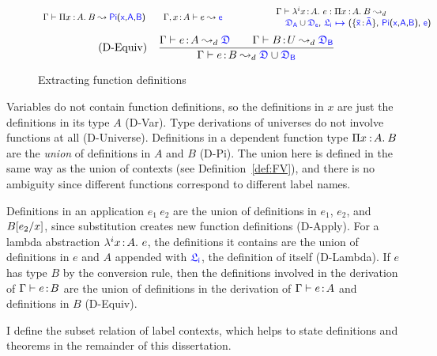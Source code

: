\begin{figure}
\begin{equation}
{{\begin{array}{l @{\qquad} l}
			   \Gamma \vdash \pitype{x}{A}{B} \leadsto \targetpi{x}{A}{B} &
			   \Gamma, x \goodcolon A \vdash e \leadsto \target{e}\\
        	\end{array}}}
			{\begin{array}{c}
			 \Gamma \vdash \lami{i}{x}{A}{e} \mathrel{:} \pitype{x}{A}{B} \leadsto_d \\
			  \qquad \qquad \qquad \target{\fdef_A} \cup \target{\fdef_e} \sfcomma \itemdef{\target{\flabel_i}}{\itemtype{\bar{x}}{\bar{A}}}{\targetpi{x}{A}{B}}{\target{e}}
			 \end{array}
			}
	\end{equation} \vspace{0.5cm}
	\begin{equation}
		\tag{D-Equiv}
		\quad
		\frac
			{\Gamma \vdash e \goodcolon A \leadsto_d \target{\fdef} \qquad \Gamma \vdash B \goodcolon U \leadsto_d \target{\fdef_B}}
			{\Gamma \vdash e \goodcolon B \leadsto_d \target{\fdef} \cup \target{\fdef_B}}
	\end{equation}
	\caption{Extracting function definitions}
    \label{fig:dcc def}
\end{figure}

Variables do not contain function definitions, so the definitions in $x$ are just the definitions in its type $A$ (D-Var). Type derivations of universes do not involve functions at all (D-Universe). Definitions in a dependent function type $\Pi x\mkern1.5mu{\hspace{0.5mm}{:}\hspace{0.5mm}} A.\hspace{0.8mm}B$ are the \textit{union} of definitions in $A$ and $B$ (D-Pi). The union here is defined in the same way as the union of contexts (see Definition~\ref{def:FV}), and there is no ambiguity since different functions correspond to different label names.

Definitions in an application $e_1\ e_2$ are the union of definitions in $e_1$, $e_2$, and $B[e_2\slash x]$, since substitution creates new function definitions (D-Apply). For a lambda abstraction $\lambda^{i}x\hspace{0.5mm}{:}\hspace{0.5mm} A.\ e$, the definitions it contains are the union of definitions in $e$ and $A$ appended with $\target{\flabel_i}$, the definition of itself (D-Lambda).
If $e$ has type $B$ by the conversion rule, then the definitions involved in the derivation of $\Gamma \vdash e \hspace{0.5mm}{:}\hspace{0.5mm} B$ are the union of definitions in the derivation of $\Gamma \vdash e \hspace{0.5mm}{:}\hspace{0.5mm} A$ and definitions in $B$ (D-Equiv).

I define the subset relation of label contexts, which helps to state definitions and theorems in the remainder of this dissertation.

